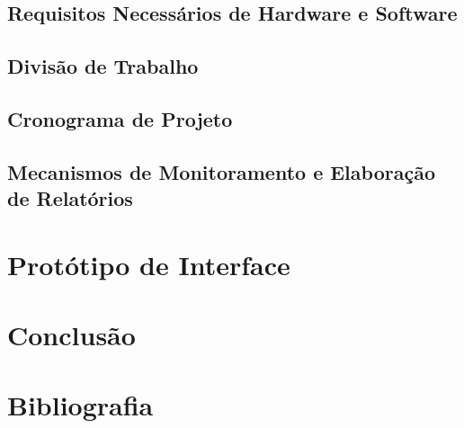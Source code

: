 \documentclass[a4paper, 12pt]{article}
\begin{document}
\subsection{Requisitos Necessários de Hardware e Software}

\subsection{Divisão de Trabalho}

\subsection{Cronograma de Projeto}

\subsection{Mecanismos de Monitoramento e Elaboração de Relatórios}

\newpage
\section{Protótipo de Interface}

\newpage
\section{Conclusão}

\newpage
\section{Bibliografia}
\end{document}
